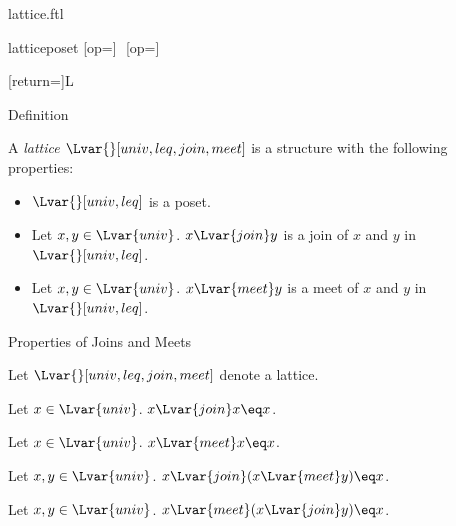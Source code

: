 \documentclass{naproche-library}
\begin{document}
\begin{smodule}[title=Lattices]{lattice.ftl}
\begin{extstructure}{lattice}{poset}
  [op=\vee]{\,\vee\,}
  [op=\wedge]{\,\wedge\,}
\end{extstructure}
[return={\lattice[comp=##1]}]{\mathcal L}

\begin{sfragment}{Definition}
  \begin{signature}[forthel,id=LatticeSig]
    A \emph{lattice $\Lvar{}[univ,leq,join,meet]$} is a structure with the following properties:
    
    \begin{itemize}
      \item\label{latticeSig}
        $\Lvar{}[univ,leq]$ is a poset.
      \item\label{latticeJoinSig}
        Let $x,y\in\Lvar{univ}$.
        $x{\Lvar{join}}y$ is a join of $x$ and $y$ in $\Lvar{}[univ,leq]$.
      \item\label{latticeMeetSig}
        Let $x,y\in\Lvar{univ}$.
        $x{\Lvar{meet}}y$ is a meet of $x$ and $y$ in $\Lvar{}[univ,leq]$.
    \end{itemize}
  \end{signature}
\end{sfragment}

\begin{sfragment}{Properties of Joins and Meets}
  \begin{forthel}
    Let $\Lvar{}[univ,leq,join,meet]$ denote a lattice.
  \end{forthel}

  \begin{proposition}[forthel,id=JoinIdempotenceThm]
    Let $x\in\Lvar{univ}$.
    $x{\Lvar{join}}x\eq x$.
  \end{proposition}

  \begin{proposition}[forthel,id=MeetIdempotenceThm]
    Let $x\in\Lvar{univ}$.
    $x{\Lvar{meet}}x\eq x$.
  \end{proposition}

  \begin{proposition}[forthel,id=JoinAbsorbsMeetThm]
    Let $x,y\in\Lvar{univ}$.
    $x{\Lvar{join}}(x{\Lvar{meet}}y)\eq x$.
  \end{proposition}

  \begin{proposition}[forthel,id=MeetAbsorbsJoinThm]
    Let $x,y\in\Lvar{univ}$.
    $x{\Lvar{meet}}(x{\Lvar{join}}y)\eq x$.
  \end{proposition}


\end{sfragment}
\end{smodule}
\end{document}
